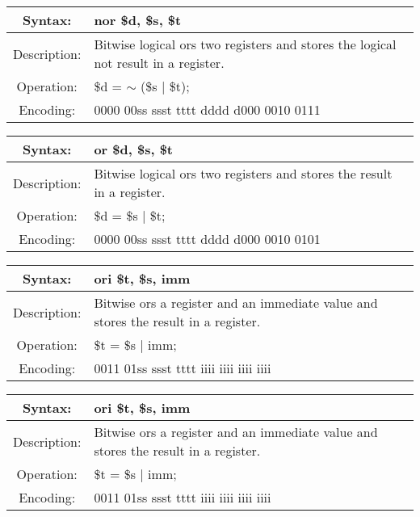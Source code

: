    \begin{table}[!hbp]
    \begin{tabularx}{\textwidth}{|c|X|}
        \hline
        Syntax: & nor \$d, \$s, \$t \\
        \hline
        Description: & Bitwise logical ors two registers and stores the logical not result in a register. \\
        \hline
        Operation: & \$d = $\sim$ (\$s | \$t); \\
        \hline
        Encoding: & 0000 00ss ssst tttt dddd d000 0010 0111 \\
        \hline
    \end{tabularx}
    \end{table}


    \begin{table}[!hbp]
    \begin{tabularx}{\textwidth}{|c|X|}
        \hline
        Syntax: & or \$d, \$s, \$t \\
        \hline
        Description: & Bitwise logical ors two registers and stores the result in a register. \\
        \hline
        Operation: & \$d = \$s | \$t; \\
        \hline
        Encoding: & 0000 00ss ssst tttt dddd d000 0010 0101 \\
        \hline
    \end{tabularx}
    \end{table}

    \begin{table}[!hbp]
    \begin{tabularx}{\textwidth}{|c|X|}
        \hline
        Syntax: & ori \$t, \$s, imm \\
        \hline
        Description: & Bitwise ors a register and an immediate value and stores the result in a register. \\
        \hline
        Operation: & \$t = \$s | imm; \\
        \hline
        Encoding: & 0011 01ss ssst tttt iiii iiii iiii iiii \\
        \hline
    \end{tabularx}
    \end{table}

    \begin{table}[!hbp]
    \begin{tabularx}{\textwidth}{|c|X|}
        \hline
        Syntax: & ori \$t, \$s, imm \\
        \hline
        Description: & Bitwise ors a register and an immediate value and stores the result in a register. \\
        \hline
        Operation: & \$t = \$s | imm; \\
        \hline
        Encoding: & 0011 01ss ssst tttt iiii iiii iiii iiii \\
        \hline
    \end{tabularx}
    \end{table}
